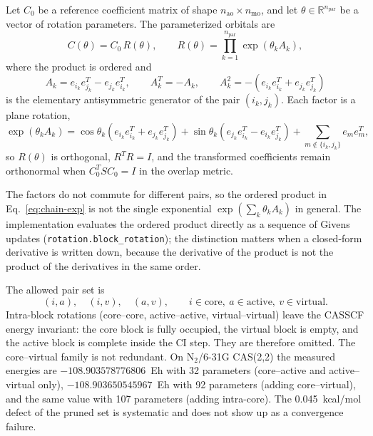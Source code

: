 Let $C_0$ be a reference coefficient matrix of shape
$n_{\mathrm{ao}}\times n_{\mathrm{mo}}$, and let
$\theta\in\mathbb{R}^{n_{\mathrm{par}}}$ be a vector of rotation
parameters.  The parameterized orbitals are
\begin{equation}
  C(\theta) = C_0\,R(\theta),
  \qquad
  R(\theta) = \prod_{k=1}^{n_{\mathrm{par}}} \exp\!\left(\theta_k A_k\right),
  \label{eq:chain-exp}
\end{equation}
where the product is ordered and
\begin{equation}
  A_k = e_{i_k}e_{j_k}^{T} - e_{j_k}e_{i_k}^{T},
  \qquad
  A_k^{T} = -A_k,
  \qquad
  A_k^{2} = -\left(e_{i_k}e_{i_k}^{T} + e_{j_k}e_{j_k}^{T}\right)
  \label{eq:chain-generator}
\end{equation}
is the elementary antisymmetric generator of the pair
$(i_k,j_k)$.  Each factor is a plane rotation,
\begin{equation}
  \exp(\theta_k A_k)
  = \cos\theta_k\left(e_{i_k}e_{i_k}^{T}+e_{j_k}e_{j_k}^{T}\right)
  + \sin\theta_k\left(e_{j_k}e_{i_k}^{T}-e_{i_k}e_{j_k}^{T}\right)
  + \sum_{m\notin\{i_k,j_k\}} e_m e_m^{T},
  \label{eq:chain-givens}
\end{equation}
so $R(\theta)$ is orthogonal, $R^{T}R=I$, and the transformed
coefficients remain orthonormal when $C_0^{T}S C_0=I$ in the overlap
metric.

The factors do not commute for different pairs, so the ordered product
in Eq.~\eqref{eq:chain-exp} is not the single exponential
$\exp(\sum_k\theta_k A_k)$ in general.  The implementation evaluates
the ordered product directly as a sequence of Givens updates
(\texttt{rotation.block\_rotation}); the distinction matters when a
closed-form derivative is written down, because the derivative of the
product is not the product of the derivatives in the same order.

The allowed pair set is
\begin{equation}
  (i,a),\quad (i,v),\quad (a,v),
  \qquad i\in\mathrm{core},\ a\in\mathrm{active},\ v\in\mathrm{virtual}.
  \label{eq:chain-pairs}
\end{equation}
Intra-block rotations (core--core, active--active, virtual--virtual)
leave the CASSCF energy invariant: the core block is fully occupied,
the virtual block is empty, and the active block is complete inside the
CI step.  They are therefore omitted.  The core--virtual family is not
redundant.  On N$_2$/6-31G CAS(2,2) the measured energies are
$-108.903578776806$~Eh with 32 parameters (core--active and
active--virtual only), $-108.903650545967$~Eh with 92 parameters
(adding core--virtual), and the same value with 107 parameters (adding
intra-core).  The 0.045~kcal/mol defect of the pruned set is systematic
and does not show up as a convergence failure.

